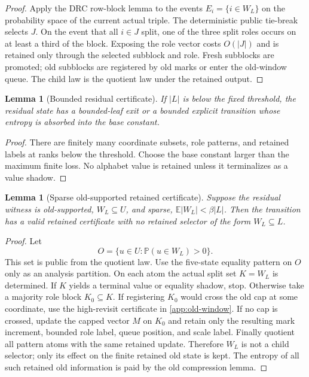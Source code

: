 \documentclass[11pt]{article}
\newcommand{\Cref}[1]{\ref{#1}}
\newtheorem{lemma}[theorem]{Lemma}
\theoremstyle{remark}
\newcommand{\E}{\mathbb E}
\newcommand{\Prob}{\mathbb P}
\begin{document}
\begin{proof}
Apply the DRC row-block lemma to the events $E_i=\{i\in W_L\}$ on the probability space of the current actual triple.  The deterministic public tie-break selects $J$.  On the event that all $i\in J$ split, one of the three split roles occurs on at least a third of the block.  Exposing the role vector costs $O(|J|)$ and is retained only through the selected subblock and role.  Fresh subblocks are promoted; old subblocks are registered by old marks or enter the old-window queue.  The child law is the quotient law under the retained output.
\end{proof}

\begin{lemma}[Bounded residual certificate]\label{lem:app-bounded-residual}
If $|L|$ is below the fixed threshold, the residual state has a bounded-leaf exit or a bounded explicit transition whose entropy is absorbed into the base constant.
\end{lemma}

\begin{proof}
There are finitely many coordinate subsets, role patterns, and retained labels at ranks below the threshold.  Choose the base constant larger than the maximum finite loss.  No alphabet value is retained unless it terminalizes as a value shadow.
\end{proof}

\begin{lemma}[Sparse old-supported retained certificate]\label{lem:app-sparse-old}
Suppose the residual witness is old-supported, $W_L\subseteq U$, and sparse, $\E |W_L|<\beta |L|$.  Then the transition has a valid retained certificate with no retained selector of the form $W_L\subseteq L$.
\end{lemma}

\begin{proof}
Let
\[
        O=\{u\in U:\Prob(u\in W_L)>0\}.
\]
This set is public from the quotient law.  Use the five-state equality pattern on $O$ only as an analysis partition.  On each atom the actual split set $K=W_L$ is determined.  If $K$ yields a terminal value or equality shadow, stop.  Otherwise take a majority role block $K_0\subseteq K$.  If registering $K_0$ would cross the old cap at some coordinate, use the high-revisit certificate in \Cref{app:old-window}.  If no cap is crossed, update the capped vector $M$ on $K_0$ and retain only the resulting mark increment, bounded role label, queue position, and scale label.  Finally quotient all pattern atoms with the same retained update.  Therefore $W_L$ is not a child selector; only its effect on the finite retained old state is kept.  The entropy of all such retained old information is paid by the old compression lemma.
\end{proof}
\end{document}
